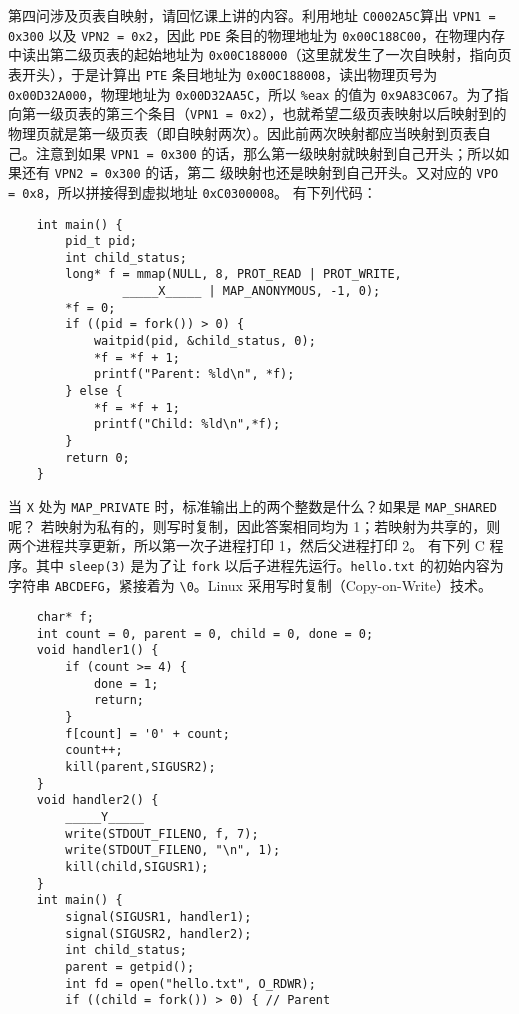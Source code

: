 \begin{problems}
        第四问涉及页表自映射，请回忆课上讲的内容。利用地址 \verb|C0002A5C|算出 \verb|VPN1 = 0x300| 以及 \verb|VPN2 = 0x2|，因此 \verb|PDE| 条目的物理地址为 \verb|0x00C188C00|，在物理内存中读出第二级页表的起始地址为 \verb|0x00C188000|（这里就发生了一次自映射，指向页表开头），于是计算出 \verb|PTE| 条目地址为 \verb|0x00C188008|，读出物理页号为 \verb|0x00D32A000|，物理地址为 \verb|0x00D32AA5C|，所以 \verb|%eax| 的值为 \verb|0x9A83C067|。为了指向第一级页表的第三个条目（\verb|VPN1 = 0x2|），也就希望二级页表映射以后映射到的物理页就是第一级页表（即自映射两次）。因此前两次映射都应当映射到页表自己。注意到如果 \verb|VPN1 = 0x300| 的话，那么第一级映射就映射到自己开头；所以如果还有 \verb|VPN2 = 0x300| 的话，第二 级映射也还是映射到自己开头。又对应的 \verb|VPO = 0x8|，所以拼接得到虚拟地址 \verb|0xC0300008|。
        \pro 有下列代码：
        \begin{verbatim}
    int main() {
        pid_t pid;
        int child_status;
        long* f = mmap(NULL, 8, PROT_READ | PROT_WRITE,
                _____X_____ | MAP_ANONYMOUS, -1, 0);
        *f = 0;
        if ((pid = fork()) > 0) {
            waitpid(pid, &child_status, 0);
            *f = *f + 1;
            printf("Parent: %ld\n", *f);
        } else {
            *f = *f + 1;
            printf("Child: %ld\n",*f);
        } 
        return 0;
    }
        \end{verbatim}
        当 \verb|X| 处为 \verb|MAP_PRIVATE| 时，标准输出上的两个整数是什么？如果是 \verb|MAP_SHARED| 呢？
        \sol 若映射为私有的，则写时复制，因此答案相同均为 1；若映射为共享的，则两个进程共享更新，所以第一次子进程打印 1，然后父进程打印 2。
        \pro 有下列 C 程序。其中 \verb|sleep(3)| 是为了让 \verb|fork| 以后子进程先运行。\verb|hello.txt| 的初始内容为字符串 \verb|ABCDEFG|，紧接着为 \verb|\0|。Linux 采用写时复制（Copy-on-Write）技术。
        \begin{verbatim}
    char* f;
    int count = 0, parent = 0, child = 0, done = 0;
    void handler1() {
        if (count >= 4) {
            done = 1;
            return;
        } 
        f[count] = '0' + count;
        count++;
        kill(parent,SIGUSR2);
    }
    void handler2() {
        _____Y_____
        write(STDOUT_FILENO, f, 7);
        write(STDOUT_FILENO, "\n", 1);
        kill(child,SIGUSR1);
    }
    int main() {
        signal(SIGUSR1, handler1);
        signal(SIGUSR2, handler2);
        int child_status;
        parent = getpid();
        int fd = open("hello.txt", O_RDWR);
        if ((child = fork()) > 0) { // Parent

\end{verbatim}
\end{problems}
